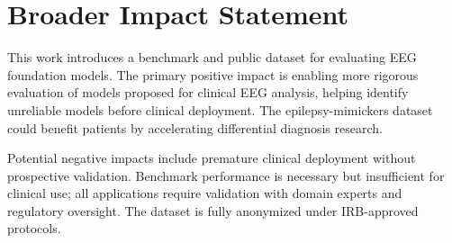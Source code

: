 \documentclass{article}
\begin{document}
\section{Broader Impact Statement}
\label{app:broader_impact}

This work introduces a benchmark and public dataset for evaluating EEG foundation models. The primary positive impact is enabling more rigorous evaluation of models proposed for clinical EEG analysis, helping identify unreliable models before clinical deployment. The epilepsy-mimickers dataset could benefit patients by accelerating differential diagnosis research.

Potential negative impacts include premature clinical deployment without prospective validation. Benchmark performance is necessary but insufficient for clinical use; all applications require validation with domain experts and regulatory oversight. The dataset is fully anonymized under IRB-approved protocols.


\FloatBarrier
\clearpage

\end{document}
